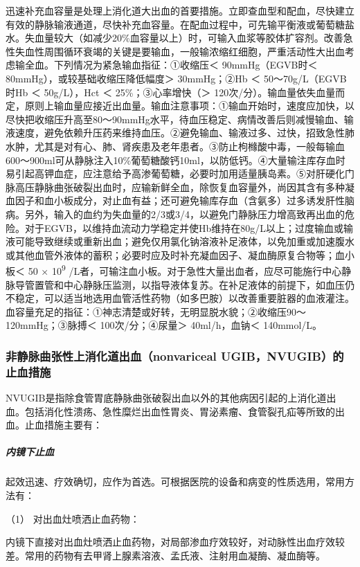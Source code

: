 迅速补充血容量是处理上消化道大出血的首要措施。立即查血型和配血，尽快建立有效的静脉输液通道，尽快补充血容量。在配血过程中，可先输平衡液或葡萄糖盐水。失血量较大（如减少20\%血容量以上）时，可输入血浆等胶体扩容剂。改善急性失血性周围循环衰竭的关键是要输血，一般输浓缩红细胞，严重活动性大出血考虑输全血。下列情况为紧急输血指征：①收缩压＜
90mmHg（EGVB时＜ 80mmHg），或较基础收缩压降低幅度＞ 30mmHg；②Hb ＜
50～70g/L（EGVB时Hb ＜ 50g/L），Hct ＜ 25\%；③心率增快（＞
120次/分）。输血量依失血量而定，原则上输血量应接近出血量。输血注意事项：①输血开始时，速度应加快，以尽快把收缩压升高至80～90mmHg水平，待血压稳定、病情改善后则减慢输血、输液速度，避免依赖升压药来维持血压。②避免输血、输液过多、过快，招致急性肺水肿，尤其是对有心、肺、肾疾患及老年患者。③防止枸橼酸中毒，一般每输血600～900ml可从静脉注入10\%葡萄糖酸钙10ml，以防低钙。④大量输注库存血时易引起高钾血症，应注意给予高渗葡萄糖，必要时加用适量胰岛素。⑤对肝硬化门脉高压静脉曲张破裂出血时，应输新鲜全血，除恢复血容量外，尚因其含有多种凝血因子和血小板成分，对止血有益；还可避免输库存血（含氨多）过多诱发肝性脑病。另外，输入的血约为失血量的2/3或3/4，以避免门静脉压力增高致再出血的危险。对于EGVB，以维持血流动力学稳定并使Hb维持在80g/L以上；过度输血或输液可能导致继续或重新出血；避免仅用氯化钠溶液补足液体，以免加重或加速腹水或其他血管外液体的蓄积；必要时应及时补充凝血因子、凝血酶原复合物等；血小板＜
50 × 10\textsuperscript{9}
/L者，可输注血小板。对于急性大量出血者，应尽可能施行中心静脉导管置管和中心静脉压监测，以指导液体复苏。在补足液体的前提下，如血压仍不稳定，可以适当地选用血管活性药物（如多巴胺）以改善重要脏器的血液灌注。血容量充足的指征：①神志清楚或好转，无明显脱水貌；②收缩压90～120mmHg；③脉搏＜
100次/分；④尿量＞ 40ml/h，血钠＜ 140mmol/L。

\subsubsection{非静脉曲张性上消化道出血（nonvariceal UGIB，NVUGIB）的止血措施}

NVUGIB是指除食管胃底静脉曲张破裂出血以外的其他病因引起的上消化道出血。包括消化性溃疡、急性糜烂出血性胃炎、胃泌素瘤、食管裂孔疝等所致的出血。止血措施主要有：

\subparagraph{内镜下止血}

起效迅速、疗效确切，应作为首选。可根据医院的设备和病变的性质选用，常用方法有：

\hypertarget{text00032.htmlux5cux23CHP1-13-1-5-3-1-1}{}
（1） 对出血灶喷洒止血药物：

内镜下直接对出血灶喷洒止血药物，对局部渗血疗效较好，对动脉性出血疗效较差。常用的药物有去甲肾上腺素溶液、孟氏液、注射用血凝酶、凝血酶等。

